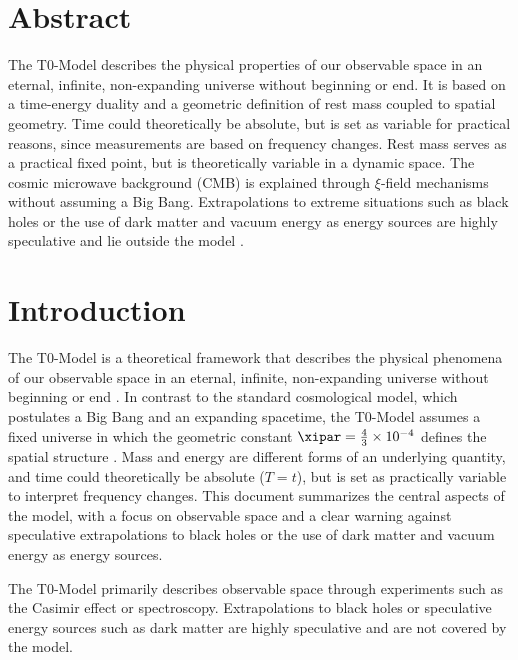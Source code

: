 
\section*{Abstract}
The T0-Model describes the physical properties of our observable space in an eternal, infinite, non-expanding universe without beginning or end. It is based on a time-energy duality and a geometric definition of rest mass coupled to spatial geometry. Time could theoretically be absolute, but is set as variable for practical reasons, since measurements are based on frequency changes. Rest mass serves as a practical fixed point, but is theoretically variable in a dynamic space. The cosmic microwave background (CMB) is explained through \(\xi\)-field mechanisms without assuming a Big Bang. Extrapolations to extreme situations such as black holes or the use of dark matter and vacuum energy as energy sources are highly speculative and lie outside the model \cite{pascher_t0_energy_2025}.

\section{Introduction}
\label{sec:introduction}

The T0-Model is a theoretical framework that describes the physical phenomena of our observable space in an eternal, infinite, non-expanding universe without beginning or end \cite{pascher_t0_energy_2025}. In contrast to the standard cosmological model, which postulates a Big Bang and an expanding spacetime, the T0-Model assumes a fixed universe in which the geometric constant \(\xipar = \frac{4}{3} \times 10^{-4}\) defines the spatial structure \cite{Casimir1948}. Mass and energy are different forms of an underlying quantity, and time could theoretically be absolute (\( T = t \)), but is set as practically variable to interpret frequency changes. This document summarizes the central aspects of the model, with a focus on observable space and a clear warning against speculative extrapolations to black holes or the use of dark matter and vacuum energy as energy sources.

\begin{warning}[Note]
	The T0-Model primarily describes observable space through experiments such as the Casimir effect or spectroscopy. Extrapolations to black holes or speculative energy sources such as dark matter are highly speculative and are not covered by the model.
\end{warning}

